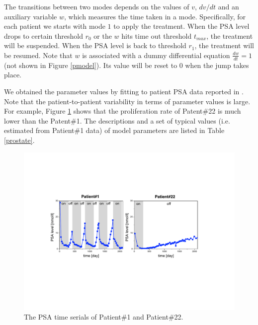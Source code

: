 The transitions between two modes depends on the values of $v$, ${dv}/{dt}$ and an auxiliary variable $w$, which measures the time taken in a mode. Specifically, for each patient we starts with mode $1$ to apply the treatment. When the PSA level drops to certain threshold $r_0$ or the $w$ hits time out threshold $t_{max}$, the treatment will be suspended. When the PSA level is back to threshold $r_1$, the treatment will be resumed. Note that $w$ is associated with a dummy differential equation $\frac{dw}{dt}=1$ (not shown in Figure \ref{pmodel}). Its value will be reset to $0$ when the jump takes place.  

We obtained the parameter values by fitting to patient PSA data reported in \cite{bruchovsky06, bruchovsky07}. Note that the patient-to-patient variability in terms of parameter values is large. For example, Figure \ref{data} shows that the proliferation rate of Patent\#22 is much lower than the Patent\#1. The descriptions and a set of typical values (i.e. estimated from Patient\#1 data) of model parameters are listed in Table \ref{prostate}.

\begin{figure}[htb]
\centering
\includegraphics[scale=0.47]{fig-data}
\caption{The PSA time serials of Patient\#1 and Patient\#22.}
\label{data}
\end{figure}




